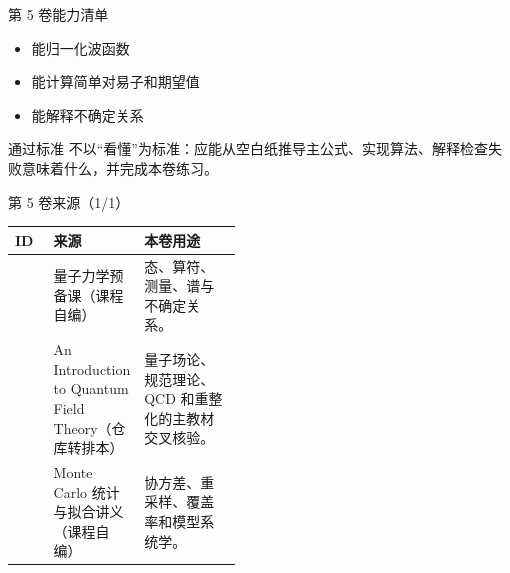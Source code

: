 \begin{frame}[t]{第 5 卷能力清单}
\small\begin{itemize}
\item[\CheckMark] 能归一化波函数
\item[\CheckMark] 能计算简单对易子和期望值
\item[\CheckMark] 能解释不确定关系
\end{itemize}\vfill\begin{block}{通过标准}
不以“看懂”为标准：应能从空白纸推导主公式、实现算法、解释检查失败意味着什么，并完成本卷练习。
\end{block}\end{frame}

\begin{frame}[t]{第 5 卷来源（1/1）}
\scriptsize\begin{tabularx}{\linewidth}{p{0.17\linewidth}p{0.28\linewidth}Y}
\toprule ID & 来源 & 本卷用途\\\midrule
{} & 量子力学预备课（课程自编） & 态、算符、测量、谱与不确定关系。\\
 & An Introduction to Quantum Field Theory（仓库转排本） & 量子场论、规范理论、QCD 和重整化的主教材交叉核验。\\
 & Monte Carlo 统计与拟合讲义（课程自编） & 协方差、重采样、覆盖率和模型系统学。\\
\bottomrule\end{tabularx}\end{frame}

